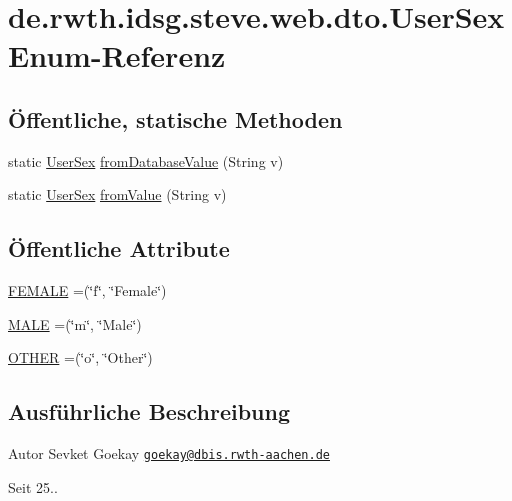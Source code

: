 \hypertarget{enumde_1_1rwth_1_1idsg_1_1steve_1_1web_1_1dto_1_1_user_sex}{\section{de.\+rwth.\+idsg.\+steve.\+web.\+dto.\+User\+Sex Enum-\/\+Referenz}
\label{enumde_1_1rwth_1_1idsg_1_1steve_1_1web_1_1dto_1_1_user_sex}
}
\subsection*{Öffentliche, statische Methoden}
\begin{DoxyCompactItemize}
\item 
static \hyperlink{enumde_1_1rwth_1_1idsg_1_1steve_1_1web_1_1dto_1_1_user_sex}{User\+Sex} \hyperlink{enumde_1_1rwth_1_1idsg_1_1steve_1_1web_1_1dto_1_1_user_sex_a1b689ca1d0045c0b3eed67418e556098}{from\+Database\+Value} (String v)
\item 
static \hyperlink{enumde_1_1rwth_1_1idsg_1_1steve_1_1web_1_1dto_1_1_user_sex}{User\+Sex} \hyperlink{enumde_1_1rwth_1_1idsg_1_1steve_1_1web_1_1dto_1_1_user_sex_ab56a204fa14e3f06adfbcca66f94871b}{from\+Value} (String v)
\end{DoxyCompactItemize}
\subsection*{Öffentliche Attribute}
\begin{DoxyCompactItemize}
\item 
\hyperlink{enumde_1_1rwth_1_1idsg_1_1steve_1_1web_1_1dto_1_1_user_sex_aa82cabc94ee438298f4bc78868ed628a}{F\+E\+M\+A\+L\+E} =(\char`\"{}f\char`\"{}, \char`\"{}Female\char`\"{})
\item 
\hyperlink{enumde_1_1rwth_1_1idsg_1_1steve_1_1web_1_1dto_1_1_user_sex_a70e31e0ed5db4940c1060e714c168c3c}{M\+A\+L\+E} =(\char`\"{}m\char`\"{}, \char`\"{}Male\char`\"{})
\item 
\hyperlink{enumde_1_1rwth_1_1idsg_1_1steve_1_1web_1_1dto_1_1_user_sex_a0a5e04c68f2d3a46583ada44e1920da9}{O\+T\+H\+E\+R} =(\char`\"{}o\char`\"{}, \char`\"{}Other\char`\"{})
\end{DoxyCompactItemize}


\subsection{Ausführliche Beschreibung}
\begin{DoxyAuthor}{Autor}
Sevket Goekay \href{mailto:goekay@dbis.rwth-aachen.de}{\tt goekay@dbis.\+rwth-\/aachen.\+de} 
\end{DoxyAuthor}
\begin{DoxySince}{Seit}
25.. 
\end{DoxySince}


